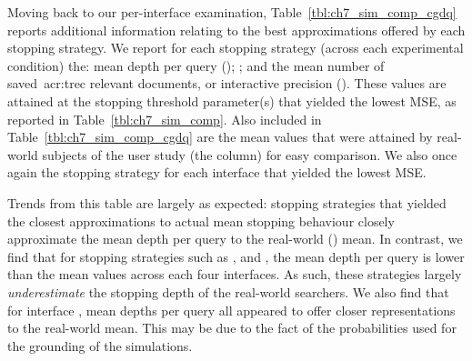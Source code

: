 Moving back to our per-interface examination, Table~\ref{tbl:ch7_sim_comp_cgdq} reports additional information relating to the best approximations offered by each stopping strategy. We report for each stopping strategy (across each experimental condition) the: mean depth per query (); ; and the mean number of saved~\gls{acr:trec} relevant documents, or interactive precision (). These values are attained at the stopping threshold parameter(s) that yielded the lowest MSE, as reported in Table~\ref{tbl:ch7_sim_comp}. Also included in Table~\ref{tbl:ch7_sim_comp_cgdq} are the mean values that were attained by real-world subjects of the user study (the  column) for easy comparison. We also once again  the stopping strategy for each interface that yielded the lowest MSE.

Trends from this table are largely as expected: stopping strategies that yielded the closest approximations to actual mean stopping behaviour closely approximate the mean depth per query to the real-world () mean. In contrast, we find that for stopping strategies such as ,  and , the mean depth per query is lower than the mean values across each four interfaces. As such, these strategies largely \emph{underestimate} the stopping depth of the real-world searchers. We also find that for interface , mean depths per query all appeared to offer closer representations to the real-world mean. This may be due to the fact of the probabilities used for the grounding of the simulations.

